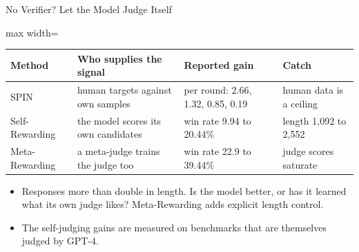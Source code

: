 \begin{frame}{No Verifier? Let the Model Judge Itself}
    \begin{center}
    \small
    \begin{adjustbox}{max width=\linewidth}\begin{tabular}{l>{\raggedright\arraybackslash}p{3.3cm}>{\raggedright\arraybackslash}p{3.8cm}>{\raggedright\arraybackslash}p{4.0cm}}
        \toprule
        \textbf{Method} & \textbf{Who supplies the signal} & \textbf{Reported gain} & \textbf{Catch} \\
        \midrule
        SPIN & human targets against own samples & per round: 2.66, 1.32, 0.85, 0.19 & human data is a ceiling \\
        Self-Rewarding & the model scores its own candidates & win rate 9.94 to 20.44\% & length 1,092 to 2,552 \\
        Meta-Rewarding & a meta-judge trains the judge too & win rate 22.9 to 39.44\% & judge scores saturate \\
        \bottomrule
    \end{tabular}\end{adjustbox}
    \end{center}
    \begin{itemize}\itemsep0.45em
        \item Responses more than double in length. Is the model better, or has it learned what its own judge likes? Meta-Rewarding adds explicit length control.
        \item The self-judging gains are measured on benchmarks that are themselves judged by GPT-4.
    \end{itemize}
\end{frame}

